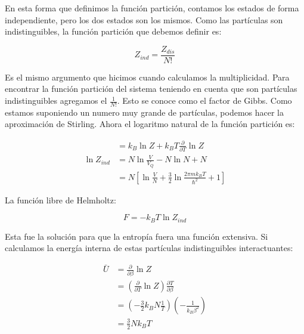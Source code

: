 \documentclass[11pt,fleqn]{book}
\begin{document}

En esta forma que definimos la función partición, contamos los estados de forma independiente, pero los dos estados son los mismos. Como las partículas son indistinguibles, la función partición que debemos definir es:

\begin{equation}
    Z_{ind}=\frac{Z_{dis}}{N!}
    \label{Eq. 4.81}
\end{equation}

Es el mismo argumento que hicimos cuando calculamos la multiplicidad. Para encontrar la función partición del sistema teniendo en cuenta que son partículas indistinguibles agregamos el $\frac{1}{N!}$. Esto se conoce como el factor de Gibbs. Como estamos suponiendo un numero muy grande de partículas, podemos hacer la aproximación de Stirling. Ahora el logaritmo natural de la función partición es:

\begin{equation} 
\begin{split}
&=k_{B}\ln{Z}+k_{B}T\frac{\partial}{\partial T}\ln{Z}\\
    \ln{Z_{ind}}&=N\ln{\frac{V}{V_{Q}}}- N\ln{N}+N\\
    &=N\left[\ln{\frac{V}{N}}+\frac{3}{2}\ln{\frac{2\pi mk_{B}T}{\hslash^{2}}}+1\right]
      \end{split}  
    \label{Eq. 4.82}
\end{equation}

La función libre de Helmholtz:

\begin{equation}
    F=-k_{B}T\ln{Z_{ind}}
        \label{Eq. 4.83}
\end{equation}

Esta fue la solución para que la entropía fuera una función extensiva. Si calculamos la energía interna de estas partículas indistinguibles interactuantes:

\begin{equation}
\begin{split}
    \bar{U}&=\frac{\partial}{\partial\beta}\ln{Z}\\
    &=\left(\frac{\partial}{\partial T}\ln{Z}\right)\frac{\partial T}{\partial\beta}\\
    &=\left(-\frac{3}{2}k_{B}N\frac{1}{T}\right)\left(-\frac{1}{k_{B}\beta^{2}}\right)\\
    &=\frac{3}{2}Nk_{B}T
      \end{split}  
    \label{Eq. 4.84}
\end{equation}
\end{document}
